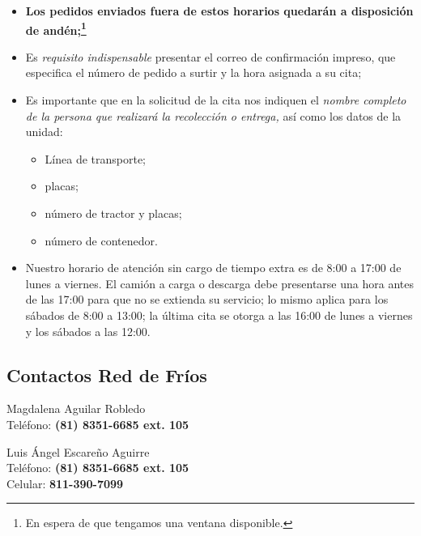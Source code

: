 \begin{itemize}
	\item \textbf{Los pedidos enviados fuera de estos horarios quedarán a disposición de andén;\footnote{En espera de que tengamos una ventana disponible.}}
	\item Es \emph{requisito indispensable} presentar el correo de confirmación impreso, que especifica el número de pedido a surtir y la hora asignada a su cita;
	\item Es importante que en la solicitud de la cita nos indiquen el \emph{nombre completo de la persona que realizará la recolección o entrega,} así como los datos de la unidad:
	      \begin{itemize}
		      \item Línea de transporte;
		      \item placas;
		      \item número de tractor y placas;
		      \item número de contenedor.
	      \end{itemize}
	\item Nuestro horario de atención sin cargo de tiempo extra es de 8:00 a 17:00 de lunes a viernes. El camión a carga o descarga debe presentarse una hora antes de las 17:00 para que no se extienda su servicio; lo mismo aplica para los sábados de 8:00 a 13:00; la última cita se otorga a las 16:00 de lunes a viernes y los sábados a las 12:00.
\end{itemize}

\newpage

\subsection{Contactos Red de Fríos}

\begin{contact} \label{contact:MesaDeControl}
	Magdalena Aguilar Robledo\\
	Teléfono: \textbf{(81) 8351-6685 ext. 105}\\
\end{contact}

\begin{contact} \label{contact:JefeDeAlmacen}
	Luis Ángel Escareño Aguirre\\
	Teléfono: \textbf{(81) 8351-6685 ext. 105}\\
	Celular: \textbf{811-390-7099}\\
\end{contact}

